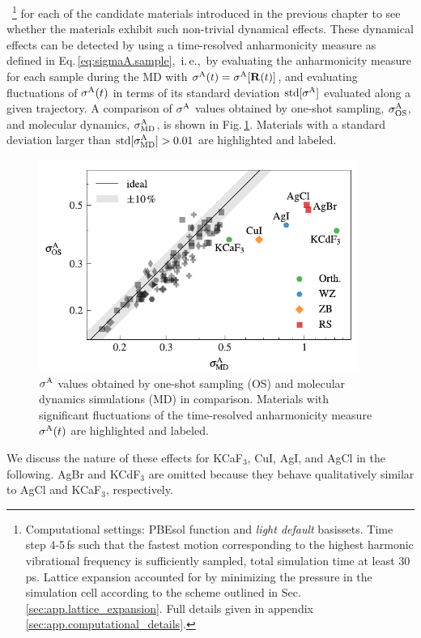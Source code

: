 ~\footnote{Computational settings: PBEsol function and \emph{light default} basissets. Time step 4-5\,fs such that the fastest motion corresponding to the highest harmonic vibrational frequency is sufficiently sampled, total simulation time at least 30\,ps. Lattice expansion accounted for by minimizing the pressure in the simulation cell according to the scheme outlined in Sec.\,\ref{sec:app.lattice_expansion}. Full details given in appendix \ref{sec:app.computational_details}.} for each of the candidate materials introduced in the previous chapter to see whether the materials exhibit such non-trivial dynamical effects. 
These dynamical effects can be detected by using a time-resolved anharmonicity measure as defined in Eq.\,\eqref{eq:sigmaA.sample},~i.\,e.,~by evaluating the anharmonicity measure for each sample during the MD with $\sigma^\mathrm{A}(t) = \sigma^\mathrm{A} [{\bf R} (t)]$, and evaluating fluctuations of $\sigma^\mathrm{A} (t)$ in terms of its standard deviation ${\rm std} [ \sigma^\mathrm{A} ]$ evaluated along a given trajectory. A comparison of $\sigma^\mathrm{A}$ values obtained by one-shot sampling, $\sigma^\mathrm{A}_\mathrm{OS}$, and molecular dynamics, $\sigma^\mathrm{A}_\mathrm{MD}$, is shown in Fig.\,\ref{fig:sigma_os_md_dataset}. Materials with a standard deviation larger than ${\rm std} [ \sigma^\mathrm{A}_\mathrm{MD} ] > 0.01$ are highlighted and labeled.
\begin{figure}
	\includegraphics[width=4.1in]{./data/plots/sigma_vs_sigma/sigma_os_md_edit.pdf}
	\caption{$\sigma^\mathrm{A}$ values obtained by one-shot sampling (OS) and molecular dynamics simulations (MD) in comparison. Materials with significant fluctuations of the time-resolved anharmonicity measure $\sigma^\mathrm{A} (t)$ are highlighted and labeled.}
	\label{fig:sigma_os_md_dataset}
\end{figure}
We discuss the nature of these effects for KCaF$_3$, CuI, AgI, and AgCl in the following. AgBr and KCdF$_3$ are omitted because they behave qualitatively similar to AgCl and KCaF$_3$, respectively. 

